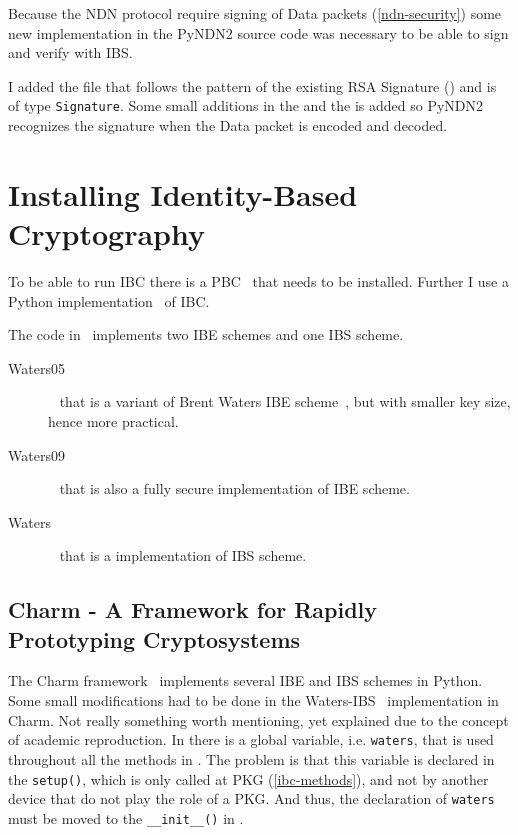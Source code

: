 Because the \gls{NDN} protocol require signing of Data packets (\autoref{ndn-security}) some new implementation in the \gls{PyNDN2} source code was necessary to be able to sign and verify with \gls{IBS}.

I added the  file that follows the pattern of the existing RSA Signature () and is of type \texttt{Signature}.
Some small additions in the  and the  is added so \gls{PyNDN2} recognizes the signature when the Data packet is encoded and decoded.

\section{Installing Identity-Based Cryptography}

To be able to run \gls{IBC} there is a \gls{PBC}~\cite{ben2007implementation} that needs to be installed.
Further I use a Python implementation~\cite{charm13} of \gls{IBC}.

The code in~\cite[identityBasedCrypto.py]{garseg15} implements two \gls{IBE} schemes and one \gls{IBS} scheme. 

\begin{description}
  \item[Waters05]~\cite{DBLP:journals/iacr/Naccache05} that is a variant of Brent Waters \gls{IBE} scheme~\cite{DBLP:journals/iacr/Waters04}, but with smaller key size, hence more practical.
  \item[Waters09]~\cite{DBLP:conf/crypto/Waters09} that is also a fully secure implementation of \gls{IBE} scheme.
  \item[Waters]~\cite{DBLP:journals/iacr/Waters04} that is a implementation of \gls{IBS} scheme.
\end{description}

\subsection{Charm - A Framework for Rapidly Prototyping Cryptosystems}
The Charm framework~\cite{charm13} implements several \gls{IBE} and \gls{IBS} schemes in Python.
Some small modifications had to be done in the Waters-\gls{IBS}~\cite{DBLP:journals/iacr/Waters04} implementation in Charm.
Not really something worth mentioning, yet explained due to the concept of academic reproduction. 
In  there is a global variable, i.e. \texttt{waters}, that is used throughout all the methods in .
The problem is that this variable is declared in the \texttt{setup()}, which is only called at \gls{PKG} (\autoref{ibc-methods}), and not by another device that do not play the role of a \gls{PKG}. 
And thus, the declaration of \texttt{waters} must be moved to the \texttt{\_\_init\_\_()} in .


